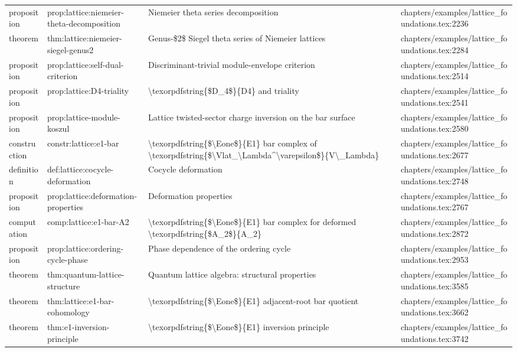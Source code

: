 \documentclass[11pt]{article}
\begin{document}
\begin{longtable}{L{0.10\textwidth}L{0.26\textwidth}L{0.42\textwidth}L{0.22\textwidth}}
proposition & prop:lattice:niemeier-theta-decomposition & Niemeier theta series decomposition & chapters/examples/lattice\_foundations.tex:2236\\
theorem & thm:lattice:niemeier-siegel-genus2 & Genus-\$2\$ Siegel theta series of Niemeier lattices & chapters/examples/lattice\_foundations.tex:2284\\
proposition & prop:lattice:self-dual-criterion & Discriminant-trivial module-envelope criterion & chapters/examples/lattice\_foundations.tex:2514\\
proposition & prop:lattice:D4-triality & \textbackslash{}texorpdfstring\{\$D\_4\$\}\{D4\} and triality & chapters/examples/lattice\_foundations.tex:2541\\
proposition & prop:lattice-module-koszul & Lattice twisted-sector charge inversion on the bar surface & chapters/examples/lattice\_foundations.tex:2580\\
construction & constr:lattice:e1-bar & \textbackslash{}texorpdfstring\{\$\textbackslash{}Eone\$\}\{E1\} bar complex of \textbackslash{}texorpdfstring\{\$\textbackslash{}Vlat\_\textbackslash{}Lambda\textasciicircum{}\textbackslash{}varepsilon\$\}\{V\textbackslash{}\_Lambda\} & chapters/examples/lattice\_foundations.tex:2677\\
definition & def:lattice:cocycle-deformation & Cocycle deformation & chapters/examples/lattice\_foundations.tex:2748\\
proposition & prop:lattice:deformation-properties & Deformation properties & chapters/examples/lattice\_foundations.tex:2767\\
computation & comp:lattice:e1-bar-A2 & \textbackslash{}texorpdfstring\{\$\textbackslash{}Eone\$\}\{E1\} bar complex for deformed \textbackslash{}texorpdfstring\{\$A\_2\$\}\{A\_2\} & chapters/examples/lattice\_foundations.tex:2872\\
proposition & prop:lattice:ordering-cycle-phase & Phase dependence of the ordering cycle & chapters/examples/lattice\_foundations.tex:2953\\
theorem & thm:quantum-lattice-structure & Quantum lattice algebra: structural properties & chapters/examples/lattice\_foundations.tex:3585\\
theorem & thm:lattice:e1-bar-cohomology & \textbackslash{}texorpdfstring\{\$\textbackslash{}Eone\$\}\{E1\} adjacent-root bar quotient & chapters/examples/lattice\_foundations.tex:3662\\
theorem & thm:e1-inversion-principle & \textbackslash{}texorpdfstring\{\$\textbackslash{}Eone\$\}\{E1\} inversion principle & chapters/examples/lattice\_foundations.tex:3742\\

\end{longtable}
\end{document}
